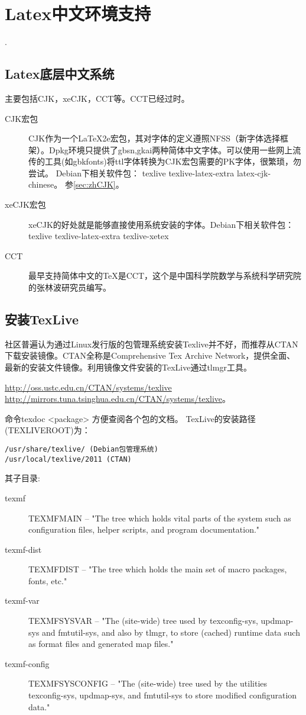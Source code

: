 
\section{Latex中文环境支持}
\label{sec:LatexInstall}.

\subsection{Latex底层中文系统}
主要包括CJK，xeCJK，CCT等。CCT已经过时。
\begin{description}
    \item[CJK宏包]
CJK作为一个LaTeX2e宏包，其对字体的定义遵照NFSS（新字体选择框架）。Dpkg环境只提供了gbsn,gkai两种简体中文字体。可以使用一些网上流传的工具(如gbkfonts)将ttl字体转换为CJK宏包需要的PK字体，很繁琐，勿尝试。
Debian下相关软件包： texlive texlive-latex-extra latex-cjk-chinese。 参\ref{sec:zhCJK}。
    \item[xeCJK宏包] xeCJK的好处就是能够直接使用系统安装的字体。Debian下相关软件包： texlive texlive-latex-extra texlive-xetex
    \item[CCT] 最早支持简体中文的TeX是CCT，这个是中国科学院数学与系统科学研究院的张林波研究员编写。
\end{description}

\subsection{安装TexLive}
社区普遍认为通过Linux发行版的包管理系统安装Texlive并不好，而推荐从CTAN下载安装镜像。CTAN全称是Comprehensive Tex Archive Network，提供全面、最新的安装文件镜像。利用镜像文件安装的TexLive通过tlmgr工具。

\url{http://oss.ustc.edu.cn/CTAN/systems/texlive}
\url{http://mirrors.tuna.tsinghua.edu.cn/CTAN/systems/texlive}。

命令texdoc <package> 方便查阅各个包的文档。
TexLive的安装路径(TEXLIVEROOT)为：
\begin{verbatim}
/usr/share/texlive/ (Debian包管理系统)
/usr/local/texlive/2011 (CTAN)
\end{verbatim}

其子目录:
\begin{description}
    \item[texmf]
TEXMFMAIN -- "The tree which holds vital parts of the system such as configuration files, helper scripts, and program documentation."
    \item[texmf-dist]
TEXMFDIST -- "The tree which holds the main set of macro packages, fonts, etc."
    \item[texmf-var]
TEXMFSYSVAR -- "The (site-wide) tree used by texconfig-sys, updmap-sys and fmtutil-sys, and also by tlmgr, to store (cached) runtime data such as format files and generated map files."
    \item[texmf-config]
TEXMFSYSCONFIG -- "The (site-wide) tree used by the utilities texconfig-sys, updmap-sys, and fmtutil-sys to store modified configuration data."
\end{description}

